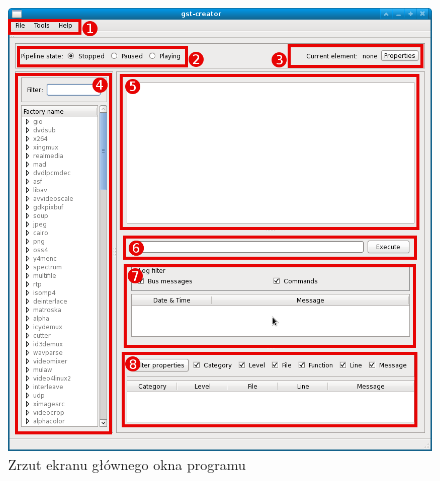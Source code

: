 \documentclass[12pt]{article}
\begin{document}
\begin{figure}[H]
  \includegraphics[width=160mm]{img/main-window.png}
  \caption{Zrzut ekranu głównego okna programu}
  \label{fig:mainWindow}
\end{figure}
\end{document}
